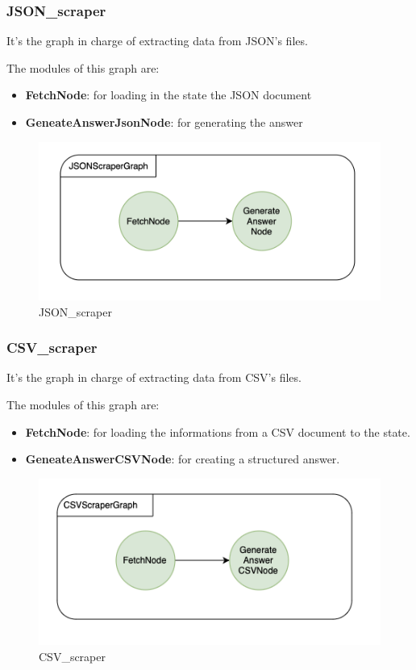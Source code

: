 \subsubsection{JSON\_scraper}
It's the graph in charge of extracting data from JSON's files.

The modules of this graph are: 
\begin{itemize}
    \item \textbf{FetchNode}: for loading in the state the JSON document 
    \item \textbf{GeneateAnswerJsonNode}: for generating the answer 
\end{itemize}

\begin{figure}[h!]
    \centering
    \includegraphics[width=0.75\linewidth]{Assets/json_scraper.png}
    \caption{JSON\_scraper}
    \label{fig:json_scraper}
\end{figure}
\subsubsection{CSV\_scraper}
It's the graph in charge of extracting data from CSV's files.

The modules of this graph are: 
\begin{itemize}
    \item \textbf{FetchNode}: for loading the informations from a CSV document to the state.
    \item \textbf{GeneateAnswerCSVNode}: for creating a structured answer.
\end{itemize}

\begin{figure}[h!]
    \centering
    \includegraphics[width=0.75\linewidth]{Assets/csv_scraper.png}
    \caption{CSV\_scraper}
    \label{fig:csv-scraper}
\end{figure}
